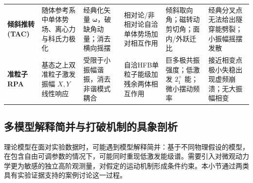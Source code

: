 \begin{table}[htbp]
\begin{tabularx}{\textwidth}{p{2.0cm}p{2.6cm}p{2.6cm}p{2.8cm}p{2.8cm}X}
\textbf{倾斜推转 (TAC)} & 随体参考系中单体势场、离心力与科氏力极化 & 经典化矢量 $\boldsymbol{\omega}$，破缺角动量；消去横向摇摆 & 相对论/非相对论自洽单体势场加对相互作用 & 倾斜取向角；磁转动剪切角；面内/外跃迁比 & 经典分叉点无法给出隧穿能劈裂；小振幅摇摆发散 \\ \addlinespace
\textbf{准粒子RPA} & 基态之上双准粒子激发振幅 $X, Y$ 线性响应 & 受限于小振幅谐振，消去非谐模式耦合 & 自洽HFB单粒子能级加残余两体相互作用 & 巨多极共振强度；低激发 $2_1^+$ 能；微小摆动频率 & 接近相变点极小失稳出现虚频崩溃；无大振幅相变 \\ \bottomrule
\end{tabularx}
\end{table}

\subsection{多模型解释简并与打破机制的具象剖析}\label{sec:2-8-5}

理论模型在面对实验数据时，可能遇到模型解释简并：基于不同物理假设的模型，在包含自由可调参数的情况下，可能同时重现低激发能级谱。需要引入对微观动力学更为敏感的独立高阶观测量，对假定的运动机制形成条件约束。本小节通过两类具有实验证据支持的案例讨论这一过程。

